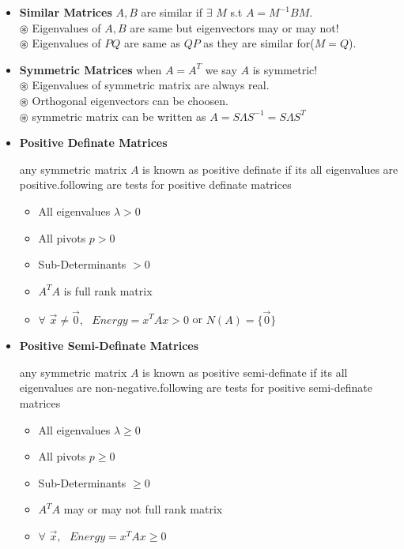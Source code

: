 \documentclass[a4paper]{article}
\numberwithin{equation}{section}
\begin{document}
\begin{itemize}
\item \textbf{Similar Matrices} $A,B$ are similar if $\exists$ $M$ s.t $A=M^{-1}BM$.\\
$\circledast$ Eigenvalues of $A,B$ are same but eigenvectors may or may not!\\
$\circledast$ Eigenvalues of $PQ$ are same as $QP$ as they are similar for($M=Q$).

\item \textbf{Symmetric Matrices} when $A=A^T$ we say $A$ is symmetric!\\
$\circledast$ Eigenvalues of symmetric matrix are always real.\\
$\circledast$ Orthogonal eigenvectors can be choosen.\\
$\circledast$ symmetric matrix can be written as $A=S\varLambda S^{-1}=S\varLambda S^T$

\item \textbf{Positive Definate Matrices}

any symmetric matrix $A$ is known as positive definate if its all eigenvalues are positive.following are tests for positive definate matrices
\begin{itemize}
\item All eigenvalues $\lambda >0$
\item All pivots $p>0$
\item Sub-Determinants $ >0$
\item $A^TA$ is full rank matrix
\item $\forall \hspace{4pt} \vec{x}\neq \vec{0},\hspace{4pt}$ $Energy=x^TAx>0$ or $N(A)=\{\vec{0}\}$
\end{itemize}
\item \textbf{Positive Semi-Definate Matrices}

any symmetric matrix $A$ is known as positive semi-definate if its all eigenvalues are non-negative.following are tests for positive semi-definate matrices
\begin{itemize}
\item All eigenvalues $\lambda \geq 0$
\item All pivots $p\geq 0$
\item Sub-Determinants $ \geq 0$
\item $A^TA$ may or may not full rank matrix
\item $\forall \hspace{4pt} \vec{x},\hspace{4pt}$ $Energy=x^TAx\geq 0$
\end{itemize}


\end{itemize}
\end{document}
